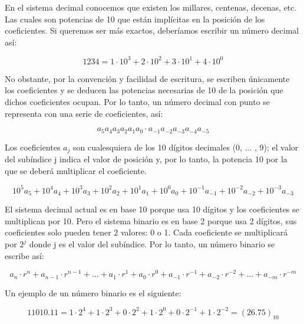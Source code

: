 En el sistema decimal conocemos que existen los millares, centenas, decenas, etc. Las cuales son 
potencias de 10 que están implícitas en la posición de los coeficientes. Si queremos ser más exactos, 
deberíamos escribir un número decimal así:

\begin{equation}
    1234 = 1 \cdot 10^3 + 2 \cdot 10^2 + 3 \cdot 10^1 + 4 \cdot 10^0
\end{equation}

No obstante, por la convención y facilidad de escritura, se escriben únicamente los coeficientes y se deducen 
las potencias necesarias de 10 de la posición que dichos coeficientes ocupan. Por lo tanto, un número decimal
con punto se representa con una serie de coeficientes, así:

\begin{equation}
    a_5a_4a_3a_2a_1a_0 \cdot a_{-1}a_{-2}a_{-3}a_{-4}a_{-5} 
\end{equation}

Los coeficientes $a_j$ son cualesquiera de los 10 dígitos decimales (0, ... , 9); el valor del subíndice j indica el 
valor de posición y, por lo tanto, la potencia 10 por la que se deberá multiplicar el coeficiente.

\begin{equation}
    10^5a_5 + 10^4a_4 + 10^3a_3 + 10^2a_2 + 10^1a_1 + 10^0a_0 + 10^{-1}a_{-1} + 10^{-2}a_{-2} + 10^{-3}a_{-3} 
\end{equation}

El sistema decimal actual es en base 10 porque usa 10 dígitos y los coeficientes se multiplican por 10. Pero el sistema
binario es en base 2 porque usa 2 dígitos, sus coeficientes solo pueden tener 2 valores: 0 o 1. Cada coeficiente se 
multiplicará por $2^j$ donde j es el valor del subíndice. Por lo tanto, un número binario se escribe así:

\begin{equation}
    a_n \cdot r^n + a_{n-1} \cdot r^{n-1} + ... + a_1 \cdot r^1 + a_0 \cdot r^0 + a_{-1} \cdot r^{-1} + a_{-2} \cdot r^{-2} + ... + a_{-m} \cdot r^{-m}
\end{equation}

Un ejemplo de un número binario es el siguiente:

\begin{equation}
    11010.11 = 1 \cdot 2^4 + 1 \cdot 2^3 + 0 \cdot 2^2 + 1 \cdot 2^0 + 0 \cdot 2^{-1} + 1 \cdot 2^{-2} = (26.75)_{10}
\end{equation}

